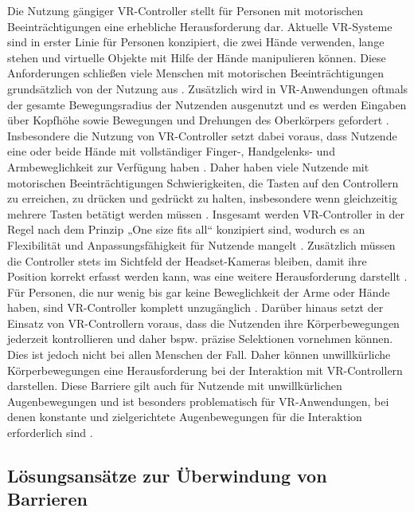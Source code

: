 Die Nutzung gängiger VR-Controller stellt für Personen mit motorischen Beeinträchtigungen eine erhebliche Herausforderung dar. Aktuelle VR-Systeme sind in erster Linie für Personen konzipiert, die zwei Hände verwenden, lange stehen und virtuelle Objekte mit Hilfe der Hände manipulieren können. Diese Anforderungen schließen viele Menschen mit motorischen Beeinträchtigungen grundsätzlich von der Nutzung aus \citep{dombrowski_designing_2019}. Zusätzlich wird in VR-Anwendungen oftmals der gesamte Bewegungsradius der Nutzenden ausgenutzt und es werden Eingaben über Kopfhöhe sowie Bewegungen und Drehungen des Oberkörpers gefordert \citep{gerling_critical_2021}. Insbesondere die Nutzung von VR-Controller setzt dabei voraus, dass Nutzende eine oder beide Hände mit vollständiger Finger-, Handgelenks- und Armbeweglichkeit zur Verfügung haben \citep{mott_accessible_2019}. Daher haben viele Nutzende mit motorischen Beeinträchtigungen Schwierigkeiten, die Tasten auf den Controllern zu erreichen, zu drücken und gedrückt zu halten, insbesondere wenn gleichzeitig mehrere Tasten betätigt werden müssen \citep{mott_i_2020}. Insgesamt werden VR-Controller in der Regel nach dem Prinzip „One size fits all“ konzipiert sind, wodurch es an Flexibilität und Anpassungsfähigkeit für Nutzende mangelt \citep{creed_inclusive_2023}. Zusätzlich müssen die Controller stets im Sichtfeld der Headset-Kameras bleiben, damit ihre Position korrekt erfasst werden kann, was eine weitere Herausforderung darstellt \citep{mott_i_2020}. Für Personen, die nur wenig bis gar keine Beweglichkeit der Arme oder Hände haben, sind VR-Controller komplett unzugänglich \citep{mott_i_2020}. Darüber hinaus setzt der Einsatz von VR-Controllern voraus, dass die Nutzenden ihre Körperbewegungen jederzeit kontrollieren und daher bspw. präzise Selektionen vornehmen können. Dies ist jedoch nicht bei allen Menschen der Fall. Daher können unwillkürliche Körperbewegungen eine Herausforderung bei der Interaktion mit VR-Controllern darstellen. Diese Barriere gilt auch für Nutzende mit unwillkürlichen Augenbewegungen und ist besonders problematisch für VR-Anwendungen, bei denen konstante und zielgerichtete Augenbewegungen für die Interaktion erforderlich sind \citep{creed_inclusive_2023}. 

\subsection{Lösungsansätze zur Überwindung von Barrieren}
\label{subchap:LösungenFürBarrieren}

